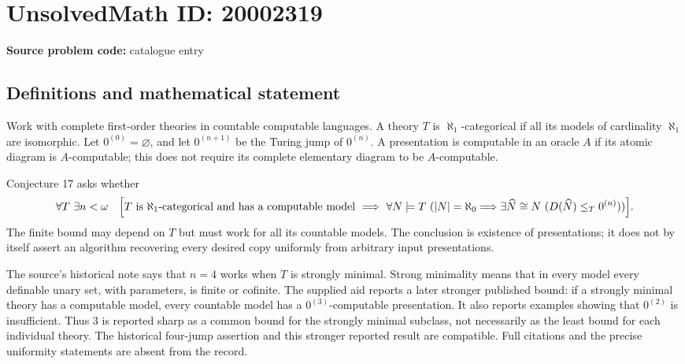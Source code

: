 \documentclass[11pt]{article}
\begin{document}
\section*{UnsolvedMath ID: 20002319}
\textbf{Source problem code:} catalogue entry
\subsection{Definitions and mathematical statement}
Work with complete first-order theories in countable computable languages. A theory \(T\) is \(\aleph_1\)-categorical if all its models of cardinality \(\aleph_1\) are isomorphic. Let \(0^{(0)}=\varnothing\), and let \(0^{(n+1)}\) be the Turing jump of \(0^{(n)}\). A presentation is computable in an oracle \(A\) if its atomic diagram is \(A\)-computable; this does not require its complete elementary diagram to be \(A\)-computable.

Conjecture 17 asks whether
\[
 \forall T\ \exists n<\omega\quad
 \Bigl[T\text{ is }\aleph_1\text{-categorical and has a computable model}
 \ \Longrightarrow\
 \forall N\models T\ (|N|=\aleph_0\Longrightarrow
 \exists\widehat N\cong N\ (D(\widehat N)\le_T0^{(n)}))\Bigr].
\]
The finite bound may depend on \(T\) but must work for all its countable models. The conclusion is existence of presentations; it does not by itself assert an algorithm recovering every desired copy uniformly from arbitrary input presentations.

The source's historical note says that \(n=4\) works when \(T\) is strongly minimal. Strong minimality means that in every model every definable unary set, with parameters, is finite or cofinite. The supplied aid reports a later stronger published bound: if a strongly minimal theory has a computable model, every countable model has a \(0^{(3)}\)-computable presentation. It also reports examples showing that \(0^{(2)}\) is insufficient. Thus \(3\) is reported sharp as a common bound for the strongly minimal subclass, not necessarily as the least bound for each individual theory. The historical four-jump assertion and this stronger reported result are compatible. Full citations and the precise uniformity statements are absent from the record.
\end{document}
